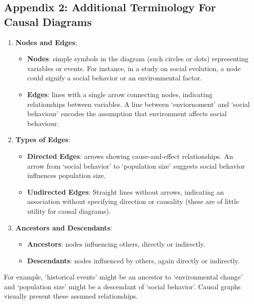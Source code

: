 \documentclass[
  singlecolumn,
  9pt]{article}
\providecommand{\tightlist}{%
  \setlength{\itemsep}{0pt}\setlength{\parskip}{0pt}}\usepackage{longtable,booktabs,array}
\begin{document}
\subsection{Appendix 2: Additional Terminology For Causal
Diagrams}\label{appendix-2-additional-terminology-for-causal-diagrams}

\begin{enumerate}
\def\labelenumi{\arabic{enumi}.}
\tightlist
\item
  \textbf{Nodes and Edges}:

  \begin{itemize}
  \tightlist
  \item
    \textbf{Nodes}: simple symbols in the diagram (such circles or dots)
    representing variables or events. For instance, in a study on social
    evolution, a node could signify a social behavior or an
    environmental factor.
  \item
    \textbf{Edges}: lines with a single arrow connecting nodes,
    indicating relationships between variables. A line between
    `enviornoment' and `social behaviour' encodes the assumption that
    environment affects social behaviour.
  \end{itemize}
\item
  \textbf{Types of Edges}:

  \begin{itemize}
  \tightlist
  \item
    \textbf{Directed Edges}: arrows showing cause-and-effect
    relationships. An arrow from `social behavior' to `population size'
    suggests social behavior influences population size.
  \item
    \textbf{Undirected Edges}: Straight lines without arrows, indicating
    an association without specifying direction or causality (these are
    of little utility for causal diagrams).
  \end{itemize}
\item
  \textbf{Ancestors and Descendants}:

  \begin{itemize}
  \tightlist
  \item
    \textbf{Ancestors}: nodes influencing others, directly or
    indirectly.
  \item
    \textbf{Descendants}: nodes influenced by others, again directly or
    indirectly.
  \end{itemize}
\end{enumerate}

For example, `historical events' might be an ancestor to `environmental
change' and `population size' might be a descendant of `social
behavior'. Causal graphs visually present these assumed relationships.
\end{document}
